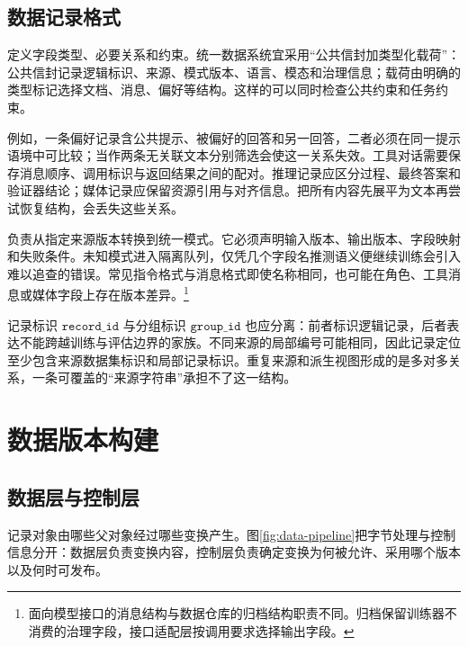 \documentclass[../textbook.tex]{subfiles}
\begin{document}
\subsection{数据记录格式}
定义字段类型、必要关系和约束。统一数据系统宜采用“公共信封加类型化载荷”：公共信封记录逻辑标识、来源、模式版本、语言、模态和治理信息；载荷由明确的类型标记选择文档、消息、偏好等结构。这样的可以同时检查公共约束和任务约束。

例如，一条偏好记录含公共提示、被偏好的回答和另一回答，二者必须在同一提示语境中可比较；当作两条无关联文本分别筛选会使这一关系失效。工具对话需要保存消息顺序、调用标识与返回结果之间的配对。推理记录应区分过程、最终答案和验证器结论；媒体记录应保留资源引用与对齐信息。把所有内容先展平为文本再尝试恢复结构，会丢失这些关系。

负责从指定来源版本转换到统一模式。它必须声明输入版本、输出版本、字段映射和失败条件。未知模式进入隔离队列，仅凭几个字段名推测语义便继续训练会引入难以追查的错误。常见指令格式与消息格式即使名称相同，也可能在角色、工具消息或媒体字段上存在版本差异。\footnote{面向模型接口的消息结构与数据仓库的归档结构职责不同。归档保留训练器不消费的治理字段，接口适配层按调用要求选择输出字段。}

记录标识 $\texttt{record\_id}$ 与分组标识 $\texttt{group\_id}$ 也应分离：前者标识逻辑记录，后者表达不能跨越训练与评估边界的家族。不同来源的局部编号可能相同，因此记录定位至少包含来源数据集标识和局部记录标识。重复来源和派生视图形成的是多对多关系，一条可覆盖的“来源字符串”承担不了这一结构。

\section{数据版本构建}

\subsection{数据层与控制层}
记录对象由哪些父对象经过哪些变换产生。图\ref{fig:data-pipeline}把字节处理与控制信息分开：数据层负责变换内容，控制层负责确定变换为何被允许、采用哪个版本以及何时可发布。
\end{document}
